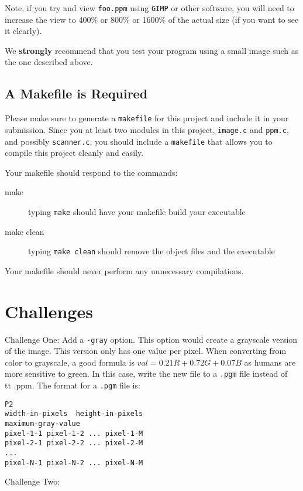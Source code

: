 \documentclass[12pt]{article}
\begin{document}
Note, if you try and view {\tt foo.ppm} using {\tt GIMP} or other software,
you will need to increase the view to 400\% or 800\% or 1600\% of the actual size
(if you want to see it clearly).

We {\bf strongly} recommend that you test your program using a small image
such as the one described above.

\subsection*{A Makefile is Required}

Please make sure to generate a {\tt makefile} for this project and include it in your
submission.  Since you at least two modules in this project,
{\tt image.c} and {\tt ppm.c}, and possibly {\tt scanner.c},
you should include a {\tt makefile} that
allows you to compile this project cleanly and easily.

Your makefile should respond to the commands:

\begin{description}
\item[make] typing \verb!make! should have your makefile build your executable
\item[make clean] typing \verb!make clean! should remove the object files and the executable
\end{description}

Your makefile should never perform any unnecessary compilations.

\section*{Challenges}

Challenge One: Add a {\tt -gray} option.  This option would create a grayscale
version of the image.  This version only has one value per pixel.  When
converting from color to grayscale, a good formula is
$val = 0.21R + 0.72G + 0.07B$ as humans are more sensitive to green.
In this case, write the new file to a {\tt .pgm} file instead of {\\ tt .ppm}.
The format for a {\tt .pgm} file is:

\begin{verbatim}
P2
width-in-pixels  height-in-pixels
maximum-gray-value
pixel-1-1 pixel-1-2 ... pixel-1-M
pixel-2-1 pixel-2-2 ... pixel-2-M
...
pixel-N-1 pixel-N-2 ... pixel-N-M
\end{verbatim}

Challenge Two: 
\end{document}
